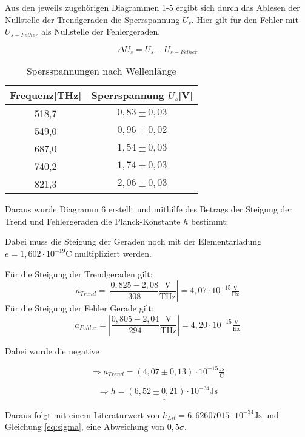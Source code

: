 Aus den jeweils zugehörigen Diagrammen 1-5 ergibt sich durch das Ablesen der Nullstelle
der Trendgeraden die Sperrspannung $U_s$. Hier gilt für den Fehler mit  $U_{s-Felher}$ als
Nullstelle der Fehlergeraden. 

\begin{equation}
    \Delta U_s = U_s - U_{s-Felher}
\end{equation}

\begin{table}[h]
    \centering
    \caption{Spersspannungen nach Wellenlänge}
    \begin{tabular}{c | c }
        \toprule
        Frequenz[THz] & Sperrspannung $U_s$[V]\\
        \midrule
        518,7 & $0,83 \pm 0,03$ \\
        549,0 & $0,96 \pm 0,02$ \\
        687,0 & $1,54 \pm 0,03$ \\
        740,2 & $1,74 \pm 0,03$ \\
        821,3 & $ 2,06 \pm 0,03$ \\
        \bottomrule
    \end{tabular}
\end{table}



Daraus wurde Diagramm 6 erstellt und mithilfe des Betrags der Steigung der Trend und Fehlergeraden die Planck-Konstante $h$ bestimmt:

Dabei muss die Steigung der Geraden noch mit der Elementarladung $e = 1,602 \cdot 10^{-19} \text{C}$
multipliziert werden.

Für die Steigung der Trendgeraden gilt:
\begin{equation}
    a_{Trend} = \left|\frac{0,825-2,08}{308} \frac{\text{V}}{\text{THz}}\right| = 4,07 \cdot 10^{-15} \tfrac{\text{V}}{\text{Hz}}
\end{equation}
Für die Steigung der Fehler Gerade gilt:
\begin{equation}
    a_{Fehler} = \left|\frac{0,805-2,04}{294}  \frac{\text{V}}{\text{THz}}\right| = 4,20 \cdot 10^{-15} \tfrac{\text{V}}{\text{Hz}}
\end{equation}

Dabei wurde die negative 

\[ \Rightarrow a_{Trend} = (4,07\pm0,13) \cdot 10^{-15}\tfrac{\text{Js}}{\text{C}}\]

\[ \Rightarrow \underline{\underline{h = (6,52 \pm 0,21 )\cdot 10^{-34} \text{Js}}}\]

Daraus folgt mit einem Literaturwert von $h_{Lit} =6,626 070 15 \cdot 10^{-34} \text{Js}$ und Gleichung \ref{eq:sigma}, eine
Abweichung von $0,5 \sigma$.


